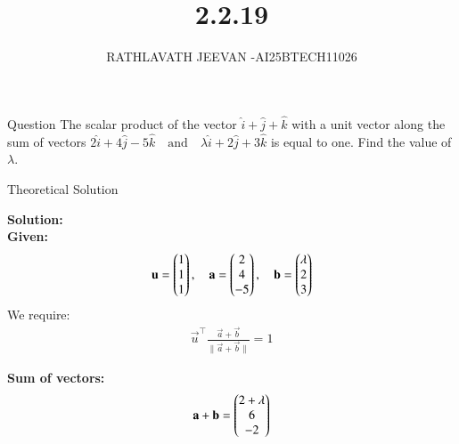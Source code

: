 \documentclass{beamer}
\title %
{2.2.19}
\author %
{RATHLAVATH JEEVAN -AI25BTECH11026}
\begin{document}
\frame{\titlepage}
\begin{frame}{Question}
The scalar product of the vector $\hat{i} + \hat{j} + \hat{k}$ with a unit vector along the sum of vectors 
$2\hat{i} + 4\hat{j} - 5\hat{k} \quad \text{and} \quad \lambda \hat{i} + 2\hat{j} + 3\hat{k}$ is equal to one. Find the value of $\lambda$.
 
\end{frame}
\begin{frame}{Theoretical Solution}

\textbf{Solution:}\\
 \textbf{Given:}  
\begin{align}
\mathbf u = \begin{pmatrix}1\\1\\1\end{pmatrix}, \quad 
\mathbf a = \begin{pmatrix}2\\4\\-5\end{pmatrix}, \quad 
\mathbf b = \begin{pmatrix}\lambda\\2\\3\end{pmatrix}
\end{align}
We require:  
\begin{align}
\vec u^\top \frac{\vec a+\vec b}{\|\vec a+\vec b\|} = 1
\end{align}

\textbf{Sum of vectors:}
\begin{align}
\mathbf a + \mathbf b = \begin{pmatrix}2+\lambda\\6\\-2\end{pmatrix}
\end{align}
\end{frame}
\end{document}
